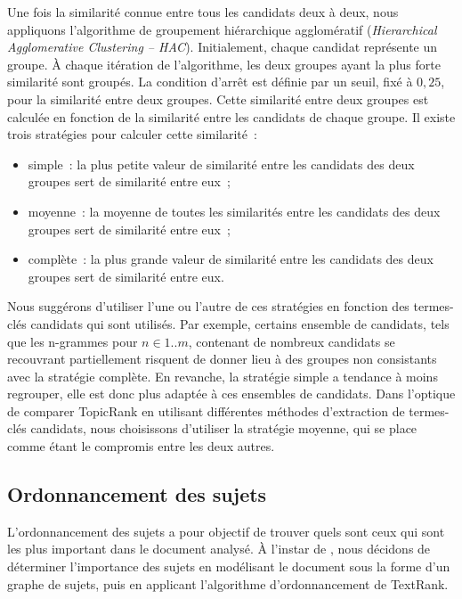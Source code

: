     Une fois la similarité connue entre tous les candidats deux à deux, nous
    appliquons l'algorithme de groupement hiérarchique agglomératif
    (\textit{Hierarchical Agglomerative Clustering -- HAC}). Initialement,
    chaque candidat représente un groupe. À chaque itération de l'algorithme,
    les deux groupes ayant la plus forte similarité sont groupés. La condition
    d'arrêt est définie par un seuil, fixé à $0,25$, pour la similarité entre
    deux groupes. Cette similarité entre deux groupes est calculée en fonction
    de la similarité entre les candidats de chaque groupe. Il existe trois
    stratégies pour calculer cette similarité~:
    \begin{itemize}
      \item{simple~: la plus petite valeur de similarité entre les candidats
            des deux groupes sert de similarité entre eux~;}
      \item{moyenne~: la moyenne de toutes les similarités entre les
            candidats des deux groupes sert de similarité entre eux~;}
      \item{complète~: la plus grande valeur de similarité entre les candidats
            des deux groupes sert de similarité entre eux.}
    \end{itemize}
    Nous suggérons d'utiliser l'une ou l'autre de ces stratégies en fonction des
    termes-clés candidats qui sont utilisés. Par exemple, certains ensemble de
    candidats, tels que les n-grammes pour $n \in 1..m$,
    contenant de nombreux candidats se recouvrant partiellement risquent de
    donner lieu à des groupes non consistants avec la stratégie complète. En
    revanche, la stratégie simple a tendance à moins regrouper, elle est donc
    plus adaptée à ces ensembles de candidats. Dans l'optique de comparer
    TopicRank en utilisant différentes méthodes d'extraction de termes-clés
    candidats, nous choisissons d'utiliser la stratégie moyenne, qui se place
    comme étant le compromis entre les deux autres.

  \subsection{Ordonnancement des sujets}
  \label{subsec:ordonnancement_des_sujets}
    L'ordonnancement des sujets a pour objectif de trouver quels sont ceux qui
    sont les plus important dans le document analysé. À l'instar de
    , nous décidons de déterminer l'importance des
    sujets en modélisant le document sous la forme d'un graphe de sujets, puis
    en applicant l'algorithme d'ordonnancement de TextRank.

